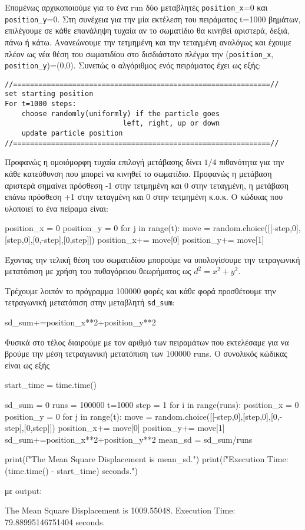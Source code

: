 Επομένως αρχικοποιούμε για το ένα {\en run} δύο μεταβλητές {\en \texttt{position\_x}}=0 και {\en \texttt{position\_y}}=0. Στη συνέχεια για την μία εκτέλεση του πειράματος {\en t}=1000 βημάτων, επιλέγουμε σε κάθε επανάληψη τυχαία αν το σωματίδιο θα κινηθεί αριστερά, δεξιά, πάνω ή κάτω. Ανανεώνουμε την τετμημένη και την τεταγμένη αναλόγως και έχουμε πλέον ως νέα θέση του σωματιδίου στο δισδιάστατο πλέγμα την
{\en (\texttt{position\_x}, \texttt{position\_y})=(0,0)}. Συνεπώς ο αλγόριθμος ενός πειράματος έχει ως εξής:
\en
\begin{lstlisting}
//=============================================================//
set starting position 
For t=1000 steps:
    choose randomly(uniformly) if the particle goes 
                            left, right, up or down
    update particle position
//=============================================================//
\end{lstlisting}
\gr
Προφανώς η ομοιόμορφη τυχαία επιλογή μετάβασης δίνει $1/4$ πιθανότητα για την κάθε κατεύθυνση που μπορεί να κινηθεί το σωματίδιο. 
Προφανώς η μετάβαση αριστερά σημαίνει πρόσθεση -1 στην τετμημένη και 0 στην τεταγμένη, η μετάβαση επάνω πρόσθεση +1 στην τεταγμένη και 0 στην τετμημένη κ.ο.κ.  Ο κώδικας που υλοποιεί το ένα πείραμα είναι:  
\en
\begin{python}
position_x = 0
position_y = 0
for j in range(t):
    move = random.choice([[-step,0],[step,0],[0,-step],[0,step]])
    position_x+= move[0]
    position_y+= move[1]
\end{python}
\gr 
Έχοντας την τελική θέση του σωματιδίου μπορούμε να υπολογίσουμε την τετραγωνική μετατόπιση με χρήση του πυθαγόρειου θεωρήματος ως $d^2 = x^2+y^2$.

Τρέχουμε λοιπόν το πρόγραμμα 100000 φορές και κάθε φορά προσθέτουμε την τετραγωνική μετατόπιση στην μεταβλητή  {\en \texttt{sd\_sum}}:
\en 
\begin{python}
sd_sum+=position_x**2+position_y**2
\end{python}
\gr
Φυσικά στο τέλος διαιρούμε με τον αριθμό των πειραμάτων που εκτελέσαμε για να βρούμε την μέση τετραγωνική μετατόπιση των 100000 {\en runs}. Ο συνολικός κώδικας είναι ως εξής \en
\begin{python}
start_time = time.time()

sd_sum = 0
runs = 100000
t=1000
step = 1
for i in range(runs):
    position_x = 0
    position_y = 0
    for j in range(t):
        move = random.choice([[-step,0],[step,0],[0,-step],[0,step]])
        position_x+= move[0]
        position_y+= move[1]
    sd_sum+=position_x**2+position_y**2
mean_sd = sd_sum/runs

print(f"The Mean Square Displacement is {mean_sd}.")
print(f"Execution Time: {(time.time() - start_time)} seconds.")
\end{python}
\gr 
με \en output:
\begin{python}
The Mean Square Displacement is 1009.55048.
Execution Time: 79.88995146751404 seconds.
\end{python}
\gr    